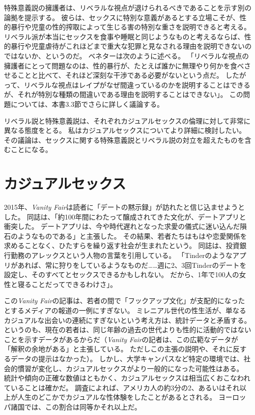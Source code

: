 \documentclass[paper=a4,book,openany]{jlreq}
\begin{document}
特殊意義説の擁護者は、リベラルな視点が退けられるべきであることを示す別の論拠を提示する。
彼らは、セックスに特別な意義があるとする立場こそが、性的暴行や児童の性的搾取によって生じる害の特別な重さを説明できると考える。
リベラル派が本当にセックスを食事や睡眠と同じようなものと考えるならば、性的暴行や児童虐待がこれほどまで重大な犯罪と見なされる理由を説明できないのではないか、というのだ。
ベネターは次のように述べる。
「リベラルな視点の擁護者にとって問題なのは、性的暴行が、たとえば誰かに無理やり何かを食べさせることと比べて、それほど深刻な干渉である必要がないという点だ。
したがって、リベラルな視点はレイプがなぜ間違っているのかを説明することはできるが、それが特別な種類の間違いである理由を説明することはできない」\citep{benatar02:_two_views_sexual_ethic}。
この問題については、本書3.3節でさらに詳しく議論する。

リベラル説と特殊意義説は、それぞれカジュアルセックスの倫理に対して非常に異なる態度をとる。
私はカジュアルセックスについてより詳細に検討したい。
その議論は、セックスに関する特殊意義説とリベラル説の対立を超えたものを含むことになる。

\section{カジュアルセックス}

2015年、\emph{Vanity Fair}は読者に「デートの黙示録」が訪れたと信じ込ませようとした。
同誌は、「約100年間にわたって醸成されてきた文化が、デートアプリと衝突した。
デートアプリは、今や時代遅れとなった求愛の儀式に迷い込んだ隕石のようなものである」と主張した。
その結果、若者たちはもはや恋愛関係を求めることなく、ひたすらを繰り返す社会が生まれたという。
同誌は、投資銀行勤務のアレックスという人物の言葉を引用している。
「Tinderのようなアプリがあれば、常に狩りをしているようなものだ……週に2、3回Tinderのデートを設定し、そのすべてとセックスできるかもしれない。
だから、1年で100人の女性と寝ることだってできるわけさ」\citep{sales15:_tind_dawn_datin_apoc}。

この\emph{Vanity Fair}の記事は、若者の間で「フックアップ文化」が支配的になったとするメディアの報道の一例にすぎない。
ミレニアル世代の性生活が、単なるカジュアルな出会いの連続にすぎないという考え方は、統計データと矛盾する。
というのも、現在の若者は、同じ年齢の過去の世代よりも性的に活動的ではないことを示すデータがあるからだ\citep[cf.][]{twenge17:_declin_sexual_frequen,twenge17:_sexual_inact_durin,monto14:_new_stand_sexual_behav}（\emph{Vanity Fair}の記者は、この広範なデータが「解釈の余地がある」と主張している。
ただしこの主張の説明や、それに反するデータの提示はなかった）。
しかし、大学キャンパスなど特定の環境では、社会的慣習が変化し、カジュアルセックスがより一般的になった可能性はある\citep[cf.][]{bogle08:_hookin}。
統計や傾向の正確な数値はともかく、カジュアルセックスは相当広くおこなわれていることは確かだ。
調査によれば、アメリカ人の約3分の2、あるいはそれ以上が人生のどこかでカジュアルな性体験をしたことがあるとされる。
ヨーロッパ諸国では、この割合は同等かそれ以上だ\citep{met17:_one_nigh_stan,how15:_this_is_how}。
\end{document}
